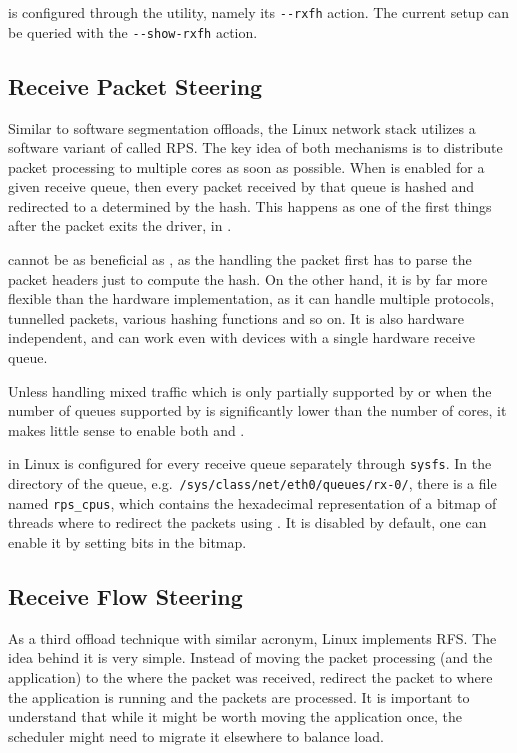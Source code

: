  is configured through the  utility, namely its
\Verb|--rxfh| action. The current setup can be queried with the
\Verb|--show-rxfh| action.

\subsection{Receive Packet Steering}
\label{sec:rps}

Similar to software segmentation offloads, the Linux network stack utilizes
a software variant of  called \acrfull{RPS}. The key idea of both mechanisms is to
distribute packet processing to multiple cores as soon as possible. When
 is enabled for a given receive queue, then every packet received by
that queue is hashed and redirected to a  determined by the hash. This
happens as one of the first things after the packet exits the  driver,
in .

 cannot be as beneficial as , as the  handling the
packet first has to parse the packet headers just to compute the hash.
On the other hand, it is by far more flexible than the hardware implementation,
as it can handle multiple protocols, tunnelled packets, various hashing
functions and so on. It is also hardware independent, and can work even with
devices with a single hardware receive queue.

Unless handling mixed traffic which is only partially supported by  or
when the number of queues supported by  is significantly lower than the number of
 cores, it makes little sense to enable both  and .

 in Linux is configured for every receive queue separately through
\texttt{sysfs}. In the directory of the queue,
e.g.\ \texttt{/sys/class/net/eth0/queues/rx-0/}, there is a file named
\texttt{rps\_cpus}, which contains the hexadecimal representation of a bitmap of
 threads where to redirect the packets using . It is disabled by
default, one can enable it by setting bits in the bitmap.

\subsection{Receive Flow Steering}

As a third offload technique with similar acronym, Linux implements \acrfull{RFS}.
The idea behind it is very simple. Instead of moving the packet processing (and
the application) to the  where the packet was received, redirect the
packet to where the application is running and the packets are processed. It is
important to understand that while it might be worth moving the application
once, the scheduler might need to migrate it elsewhere to balance load.

